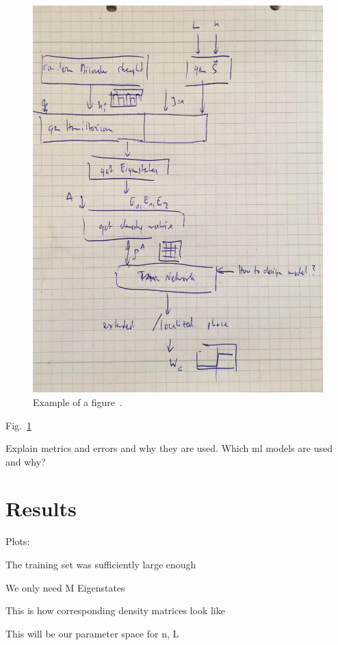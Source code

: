 \documentclass[reprint,amsmath,amssymb,aps,prb]{revtex4-2}
\begin{document}
\begin{figure}[h!]
	\includegraphics[width=0.99\linewidth]{figures/flowchart.jpg}
	\caption{Example of a figure~\cite{Orus2013}.}
	\label{fig:example}
\end{figure}

Fig.~\ref{fig:example}

Explain metrics and errors and why they are used. Which ml models are used and why?

\section{Results}%

Plots: 

The training set was sufficiently large enough

We only need M Eigenstates

This is how corresponding density matrices look like

This will be our parameter space for n, L
\end{document}
